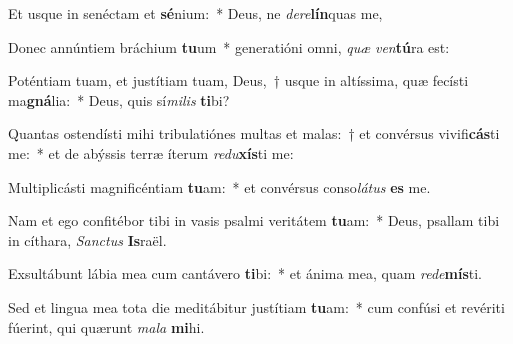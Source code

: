 \item Et usque in senéctam et \textbf{sé}nium:~* Deus, ne \textit{de}\textit{re}\textbf{lín}quas me,
\item Donec annúntiem bráchium \textbf{tu}um~* generatióni omni, \textit{quæ} \textit{ven}\textbf{tú}ra est:
\item Poténtiam tuam, et justítiam tuam, Deus,~† usque in altíssima, quæ fecísti ma\textbf{gná}lia:~* Deus, quis sí\textit{mi}\textit{lis} \textbf{ti}bi?
\item Quantas ostendísti mihi tribulatiónes multas et malas:~† et convérsus vivifi\textbf{cás}ti me:~* et de abýssis terræ íterum \textit{re}\textit{du}\textbf{xís}ti me:
\item Multiplicásti magnificéntiam \textbf{tu}am:~* et convérsus conso\textit{lá}\textit{tus} \textbf{es} me.
\item Nam et ego confitébor tibi in vasis psalmi veritátem \textbf{tu}am:~* Deus, psallam tibi in cíthara, \textit{Sanc}\textit{tus} \textbf{Is}raël.
\item Exsultábunt lábia mea cum cantávero \textbf{ti}bi:~* et ánima mea, quam \textit{red}\textit{e}\textbf{mís}ti.
\item Sed et lingua mea tota die meditábitur justítiam \textbf{tu}am:~* cum confúsi et revériti fúerint, qui quærunt \textit{ma}\textit{la} \textbf{mi}hi.

